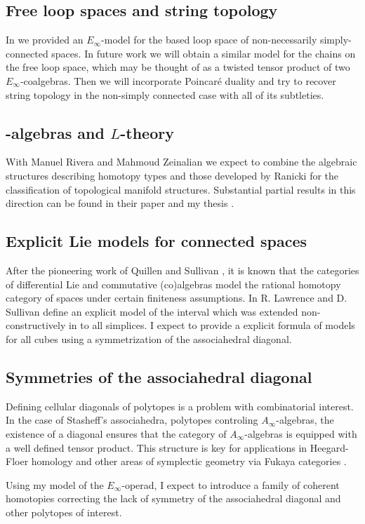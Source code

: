 \subsection{Free loop spaces and string topology}

In \cite{medina2021cobar} we provided an $E_\infty$-model for the based loop space of non-necessarily simply-connected spaces.
In future work we will obtain a similar model for the chains on the free loop space, which may be thought of as a twisted tensor product of two $E_\infty$-coalgebras.
Then we will incorporate Poincar\'{e} duality and try to recover string topology in the non-simply connected case with all of its subtleties.

\subsection{\pdfEinfty-algebras and $L$-theory}

With Manuel Rivera and Mahmoud Zeinalian we expect to combine the algebraic structures describing homotopy types \cite{sullivan1977infinitesimal, mandell2001padic} and those developed by Ranicki \cite{ranicki1992topological} for the classification of topological manifold structures.
Substantial partial results in this direction can be found in their paper \cite{rivera2018rigidification} and my thesis \cite{medina2015thesis}.

\subsection{Explicit Lie models for connected spaces}

After the pioneering work of Quillen \cite{quillen1969rational} and Sullivan \cite{sullivan1977infinitesimal}, it is known that the categories of differential Lie and commutative (co)algebras model the rational homotopy category of spaces under certain finiteness assumptions.
In \cite{lawrence2014interval} R. Lawrence and D. Sullivan define an explicit model of the interval which was extended non-constructively in \cite{buijs2020liemodels} to all simplices.
I expect to provide a explicit formula of models for all cubes using a symmetrization of the associahedral diagonal.

\subsection{Symmetries of the associahedral diagonal}

Defining cellular diagonals of polytopes is a problem with combinatorial interest.
In the case of Stasheff's associahedra, polytopes controling $A_\infty$-algebras,
the existence of a diagonal ensures that the category of $A_\infty$-algebras is equipped with a well defined tensor product.
This structure is key for applications in Heegard-Floer homology and other areas of symplectic geometry via Fukaya categories \cite{lipshitz2020diagonals}.

Using my model of the $E_\infty$-operad, I expect to introduce a family of coherent homotopies correcting the lack of symmetry of the associahedral diagonal and other polytopes of interest.
